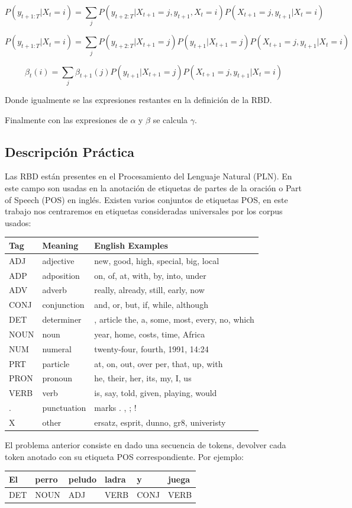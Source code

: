 \documentclass[]{article}
\begin{document}
$$P(y_{t+1:T}| X_t = i) = \sum_j P(y_{t+2:T}| X_{t+1}=j, y_{t+1}, X_t=i) P(X_{t+1}=j, y_{t+1}|X_t = i)$$

$$P(y_{t+1:T}| X_t = i) = \sum_j P(y_{t+2:T}| X_{t+1}=j) P(y_{t+1}| X_{t+1}=j)P(X_{t+1}=j, y_{t+1}|X_t = i)$$

$$\beta_{t}(i) = \sum_j \beta_{t+1}(j) P(y_{t+1}| X_{t+1}=j)P(X_{t+1}=j, y_{t+1}|X_t = i)$$

Donde igualmente se las expresiones restantes en la definición de la
RBD.

Finalmente con las expresiones de $\alpha$ y
$\beta$ se calcula $\gamma$.

\subsection{Descripción Práctica}\label{header-n61}

Las RBD están presentes en el Procesamiento del Lenguaje Natural (PLN).
En este campo son usadas en la anotación de etiquetas de partes de la
oración o Part of Speech (POS) en inglés. Existen varios conjuntos de
etiquetas POS, en este trabajo nos centraremos en etiquetas consideradas
universales por los corpus usados:

\begin{longtable}[]{@{}lll@{}}
\toprule
Tag & Meaning & English Examples\tabularnewline
\midrule
\endhead
ADJ & adjective & new, good, high, special, big, local\tabularnewline
ADP & adposition & on, of, at, with, by, into, under\tabularnewline
ADV & adverb & really, already, still, early, now\tabularnewline
CONJ & conjunction & and, or, but, if, while, although\tabularnewline
DET & determiner & , article the, a, some, most, every, no,
which\tabularnewline
NOUN & noun & year, home, costs, time, Africa\tabularnewline
NUM & numeral & twenty-four, fourth, 1991, 14:24\tabularnewline
PRT & particle & at, on, out, over per, that, up, with\tabularnewline
PRON & pronoun & he, their, her, its, my, I, us\tabularnewline
VERB & verb & is, say, told, given, playing, would\tabularnewline
. & punctuation & marks . , ; !\tabularnewline
X & other & ersatz, esprit, dunno, gr8, univeristy\tabularnewline
\bottomrule
\end{longtable}

El problema anterior consiste en dado una secuencia de tokens, devolver
cada token anotado con su etiqueta POS correspondiente. Por ejemplo:

\begin{longtable}[]{@{}llllll@{}}
\toprule
El & perro & peludo & ladra & y & juega\tabularnewline
\midrule
\endhead
DET & NOUN & ADJ & VERB & CONJ & VERB\tabularnewline
\bottomrule
\end{longtable}
\end{document}
